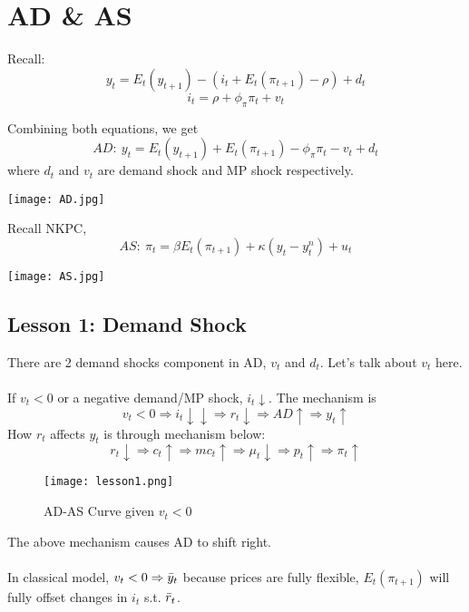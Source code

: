 \documentclass{article}
\begin{document}
\pagebreak

\section{AD \& AS}
Recall:
$$y_t = E_t(y_{t+1}) - (i_t + E_t(\pi_{t+1}) - \rho) + d_t$$
$$i_t = \rho + \phi_\pi \pi_t + v_t$$

\noindent Combining both equations, we get
$$AD:\ y_t = E_t(y_{t+1}) + E_t (\pi_{t+1}) - \phi_\pi \pi_t - v_t + d_t$$
where $d_t$ and $v_t$ are demand shock and MP shock respectively.\\
{\centering\texttt{[image: AD.jpg]}\par}

\noindent Recall NKPC, \\
$$AS:\ \pi_t = \beta E_t(\pi_{t+1}) + \kappa (y_t - y_t^n) + u_t$$
{\centering\texttt{[image: AS.jpg]}\par}

\subsection{Lesson 1: Demand Shock}
There are 2 demand shocks component in AD, $v_t$ and $d_t$. Let's talk about $v_t$ here. \\
\\
If $v_t < 0$ or a negative demand/MP shock, $i_t\downarrow$. The mechanism is 
$$v_t < 0 \Rightarrow i_t \downarrow\downarrow \Rightarrow r_t \downarrow \Rightarrow AD\uparrow \Rightarrow y_t \uparrow$$
\noindent How $r_t$ affects $y_t$ is through mechanism below:
$$r_t \downarrow \Rightarrow c_t \uparrow \Rightarrow mc_t \uparrow \Rightarrow \mu_t \downarrow \Rightarrow p_t\uparrow \Rightarrow \pi_t\uparrow$$
\begin{figure}[h!]
    \centering
    \texttt{[image: lesson1.png]}
    \caption{AD-AS Curve given $v_t < 0$}
    \label{fig:enter-label}
\end{figure}

\noindent The above mechanism causes AD to shift right.\\
\\
In classical model, $v_t < 0 \Rightarrow \Bar{y}_t$ because prices are fully flexible, $E_t(\pi_{t+1})$ will fully offset changes in $i_t$ s.t.  $\Bar{r}_t$.
\end{document}

